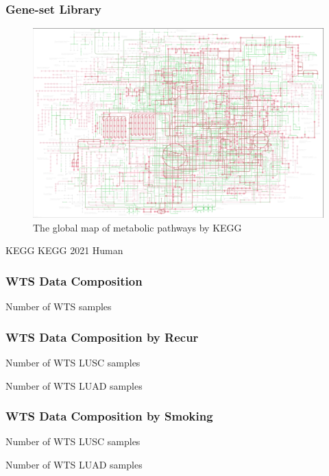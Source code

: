 \documentclass{beamer}
\begin{document}
    \begin{frame}
        \frametitle{Gene-set Library}

        \begin{figure}
            \includegraphics[width=0.6 \linewidth]{figures/Workflow/KEGG.jpg}
            \caption{The global map of metabolic pathways by KEGG \protect\cite{KEGG1}}
        \end{figure}

        \begin{block}{KEGG}
            KEGG 2021 Human
        \end{block}
    \end{frame}

    \begin{frame}
        \frametitle{WTS Data Composition}

        \begin{table}
            \caption{Number of WTS samples}
            
        \end{table}
    \end{frame}

    \begin{frame}[allowframebreaks]
        \frametitle{WTS Data Composition by Recur}

        \begin{table}
            \caption{Number of WTS LUSC samples}
            
        \end{table}

        \begin{table}
            \caption{Number of WTS LUAD samples}
            
        \end{table}
    \end{frame}

    \begin{frame}[allowframebreaks]
        \frametitle{WTS Data Composition by Smoking}

        \begin{table}
            \caption{Number of WTS LUSC samples}
            
        \end{table}

        \begin{table}
            \caption{Number of WTS LUAD samples}
            
        \end{table}
    \end{frame}
\end{document}
